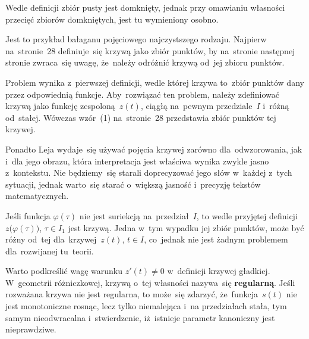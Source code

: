 \documentclass[a4paper,11pt]{article}
\begin{document}
\vspace{\spaceFour}





\noindent
{} Wedle definicji zbiór pusty jest domknięty, jednak przy omawianiu
własności przecięć zbiorów domkniętych, jest tu wymieniony osobno.

\vspace{\spaceFour}





\noindent
{} Jest to przykład bałaganu pojęciowego najczystszego rodzaju.
Najpierw na~stronie~28 definiuje~się krzywą jako zbiór punktów, by
na~stronie następnej stronie zwraca~się uwagę, że~należy odróżnić krzywą
od~jej zbioru punktów.

Problem wynika z~pierwszej definicji, wedle której krzywa to~zbiór
punktów dany przez odpowiednią funkcje. Aby~rozwiązać ten problem,
należy zdefiniować krzywą jako funkcję zespoloną~$z( t )$, ciągłą
na~pewnym przedziale~$I$ i~różną od~stałej. Wówczas wzór~(1)
na~stronie~28 przedstawia zbiór punktów tej krzywej.

Ponadto Leja wydaje~się używać pojęcia krzywej zarówno
dla~odwzorowania, jak i~dla jego obrazu, która interpretacja jest
właściwa wynika zwykle jasno z~kontekstu. Nie będziemy~się starali
doprecyzować jego słów w~każdej z~tych sytuacji, jednak warto~się
starać o~większą jasność i~precyzję tekstów matematycznych.

\vspace{\spaceFour}





\noindent
{} Jeśli funkcja $\varphi( \tau )$ nie jest suriekcją na~przedział~$I$, to
wedle przyjętej definicji~$z\big( \varphi( \tau ) \big)$, $\tau \in I_{ 1 }$ jest krzywą.
Jedna w~tym wypadku jej zbiór punktów, może być różny od~tej
dla~krzywej~$z( t )$, $t \in I$, co~jednak nie jest żadnym problemem
dla~rozwijanej tu~teorii.

\vspace{\spaceFour}





\noindent
{} Warto podkreślić wagę warunku $z'( t ) \neq 0$ w~definicji krzywej
gładkiej. W~geometrii różniczkowej, krzywą o~tej własności nazywa~się
\textbf{regularną}. Jeśli rozważana krzywa nie jest regularna, to może~się
zdarzyć, że~funkcja~$s( t )$ nie jest monotoniczne rosnąc, lecz tylko
niemalejąca i~na przedziałach stała, tym samym nieodwracalna
i~stwierdzenie, iż~istnieje parametr kanoniczny jest nieprawdziwe.
\end{document}
